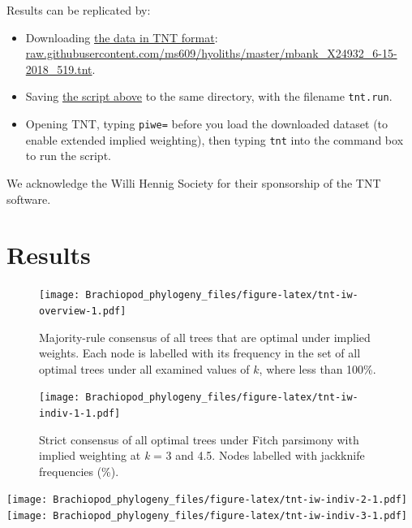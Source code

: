 \documentclass[openany]{book}
\providecommand{\tightlist}{%
  \setlength{\itemsep}{0pt}\setlength{\parskip}{0pt}}
\begin{document}
Results can be replicated by:

\begin{itemize}
\tightlist
\item
  Downloading
  \href{https://raw.githubusercontent.com/ms609/hyoliths/master/mbank_X24932_6-15-2018_519.tnt}{the
  data in TNT format}:
  \href{https://raw.githubusercontent.com/ms609/hyoliths/master/mbank_X24932_6-15-2018_519.tnt}{raw.githubusercontent.com/ms609/hyoliths/master/mbank\_X24932\_6-15-2018\_519.tnt}.
\item
  Saving
  \href{https://raw.githubusercontent.com/ms609/hyoliths/master/tnt.run}{the
  script above} to the same directory, with the filename
  \texttt{tnt.run}.
\item
  Opening TNT, typing \texttt{piwe=} before you load the downloaded
  dataset (to enable extended implied weighting), then typing
  \texttt{tnt} into the command box to run the script.
\end{itemize}

We acknowledge the Willi Hennig Society for their sponsorship of the TNT
software.

\section{Results}\label{results}










\begin{figure}
\centering
\texttt{[image: Brachiopod\_phylogeny\_files/figure-latex/tnt-iw-overview-1.pdf]}
\caption{\label{fig:tnt-iw-overview}Majority-rule consensus of all trees that are optimal
under implied weights. Each node is labelled with its frequency in the set
of all optimal trees under all examined values of \(k\), where less than
100\%.}
\end{figure}




\begin{figure}
\centering
\texttt{[image: Brachiopod\_phylogeny\_files/figure-latex/tnt-iw-indiv-1-1.pdf]}
\caption{\label{fig:tnt-iw-indiv-1}Strict consensus of all optimal trees under Fitch
parsimony with implied weighting at \emph{k} = 3 and 4.5.
Nodes labelled with jackknife frequencies (\%).}
\end{figure}

\texttt{[image: Brachiopod\_phylogeny\_files/figure-latex/tnt-iw-indiv-2-1.pdf]}
\texttt{[image: Brachiopod\_phylogeny\_files/figure-latex/tnt-iw-indiv-3-1.pdf]}
\end{document}

